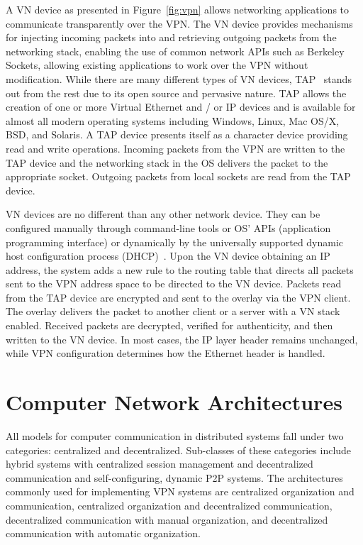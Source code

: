 A VN device as presented in Figure~\ref{fig:vpn} allows networking applications
to communicate transparently over the VPN.  The VN device provides mechanisms
for injecting incoming packets into and retrieving outgoing packets from the
networking stack, enabling the use of common network APIs such as Berkeley
Sockets, allowing existing applications to work over the VPN without
modification.  While there are many different types of VN devices,
TAP~\cite{tap} stands out from the rest due to its open source and pervasive
nature.  TAP allows the creation of one or more Virtual Ethernet and / or IP
devices and is available for almost all modern operating systems including
Windows, Linux, Mac OS/X, BSD, and Solaris.  A TAP device presents itself as a
character device providing read and write operations.  Incoming packets from
the VPN are written to the TAP device and the networking stack in the OS
delivers the packet to the appropriate socket.  Outgoing packets from local
sockets are read from the TAP device.

VN devices are no different than any other network device.  They can be
configured manually through command-line tools or OS' APIs (application
programming interface) or dynamically by the universally supported dynamic host
configuration process (DHCP)~\cite{dhcp0, dhcp1}.  Upon the VN device obtaining
an IP address, the system adds a new rule to the routing table that directs all
packets sent to the VPN address space to be directed to the VN device.  Packets
read from the TAP device are encrypted and sent to the overlay via the VPN
client.  The overlay delivers the packet to another client or a server with a
VN stack enabled.  Received packets are decrypted, verified for authenticity,
and then written to the VN device.  In most cases, the IP layer header remains
unchanged, while VPN configuration determines how the Ethernet header is
handled.

\section{Computer Network Architectures}

All models for computer communication in distributed systems fall under two
categories:  centralized and decentralized.  Sub-classes of these categories
include hybrid systems with centralized session management and decentralized
communication and self-configuring, dynamic P2P systems.  The architectures
commonly used for implementing VPN systems are centralized organization and
communication, centralized organization and decentralized communication,
decentralized communication with manual organization, and decentralized
communication with automatic organization.

